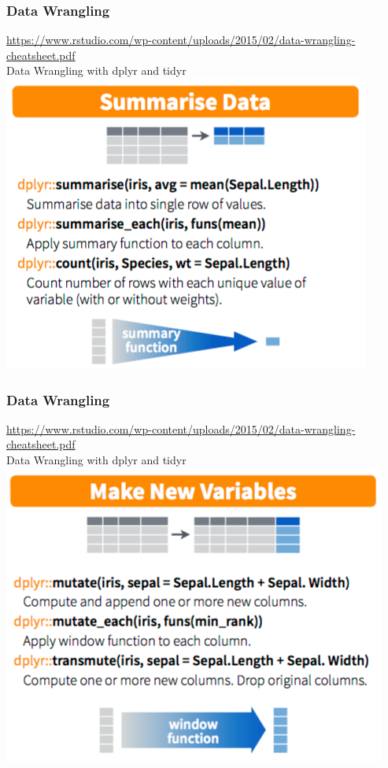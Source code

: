 \documentclass{beamer}
\begin{document}
\begin{frame}[fragile]
	\frametitle{Data Wrangling}
	\centering \tiny \url{https://www.rstudio.com/wp-content/uploads/2015/02/data-wrangling-cheatsheet.pdf}\\
	\centering \Large Data Wrangling with dplyr and tidyr
	\vspace{10pt}
	\includegraphics{figures/dp5.png}

\end{frame}

\begin{frame}[fragile]
	\frametitle{Data Wrangling}
	\centering \tiny \url{https://www.rstudio.com/wp-content/uploads/2015/02/data-wrangling-cheatsheet.pdf}\\
	\centering \Large Data Wrangling with dplyr and tidyr
	\vspace{5pt}
	\includegraphics{figures/dp6.png}

\end{frame}
\end{document}
